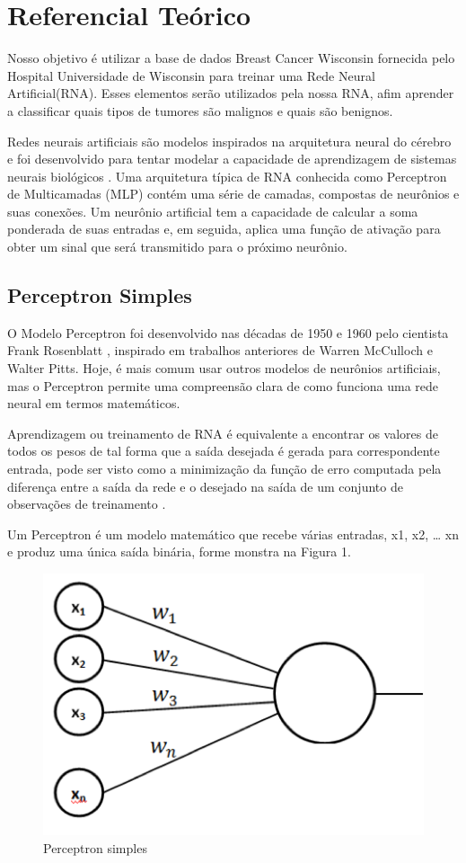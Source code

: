 \documentclass[conference]{IEEEtran}
\begin{document}
\section{Referencial Teórico}
	
	Nosso objetivo é utilizar a base de dados Breast Cancer Wisconsin \cite{b8} fornecida pelo Hospital Universidade de Wisconsin para treinar uma Rede Neural Artificial(RNA). Esses elementos serão utilizados pela nossa RNA, afim aprender a classificar quais tipos de tumores são malignos e quais são benignos. 
	
	Redes neurais artificiais são modelos inspirados na arquitetura neural do cérebro e foi desenvolvido para tentar modelar a capacidade de aprendizagem de sistemas neurais biológicos \cite{b4}. Uma arquitetura típica de RNA conhecida como Perceptron de Multicamadas (MLP) contém uma série de camadas, compostas de neurônios e suas conexões. Um neurônio artificial tem a capacidade de calcular a soma ponderada de suas entradas e, em seguida, aplica uma função de ativação para obter um sinal que será transmitido para o próximo neurônio.
	
	\subsection{Perceptron Simples}
	O Modelo Perceptron foi desenvolvido nas décadas de 1950 e 1960 pelo cientista Frank Rosenblatt \cite{b9}, inspirado em trabalhos anteriores de Warren McCulloch e Walter Pitts. Hoje, é mais comum usar outros modelos de neurônios artificiais, mas o Perceptron permite uma compreensão clara de como funciona uma rede neural em termos matemáticos.
	
	
    Aprendizagem ou treinamento de RNA é equivalente a encontrar os valores de todos os pesos de tal forma que a saída desejada é gerada para correspondente entrada, pode ser visto como a minimização da função de erro computada pela diferença entre a saída da rede e o desejado na saída de um conjunto de observações de treinamento \cite{b6}.
	
	Um Perceptron é um modelo matemático que recebe várias entradas, x1, x2, … xn e produz uma única saída binária, forme monstra na Figura 1.
	
	\begin{figure}[htbp]
	\centerline{\includegraphics[scale=1]{Perceptron.png}}
	\caption{Perceptron simples}
	\label{fig}
	\end{figure}
	
\end{document}
